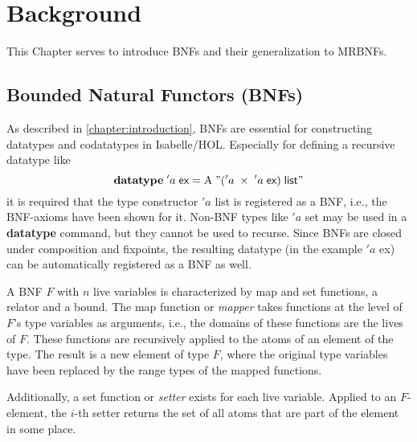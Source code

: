 
\chapter{Background}
\label{chapter:background}

  This Chapter serves to introduce \acp{BNF} and their generalization to \acp{MRBNF}. 
  \section{Bounded Natural Functors (BNFs)}
    As described in \autoref{chapter:introduction}, \acp{BNF} are essential for constructing datatypes and codatatypes in Isabelle/HOL. Especially for defining a recursive datatype like 
    \begin{equation*}
      \textbf{datatype}\; 'a\; \textsf{ex} = \text{A}\; "('a\; \times\; 'a\; \textsf{ex})\; \textsf{list}"
    \end{equation*}
    it is required that the type constructor \textsf{$'a$ list} is registered as a \ac{BNF}, i.e., the \ac{BNF}-axioms have been shown for it. Non-\ac{BNF} types like \textsf{$'a$ set} may be used in a \textbf{datatype} command, but they cannot be used to recurse. Since \acp{BNF} are closed under composition and fixpoints, the resulting datatype (in the example \textsf{$'a$ ex}) can be automatically registered as a \ac{BNF} as well.


    A \ac{BNF} $F$ with $n$ live variables is characterized by map and set functions, a relator and a bound. The map function or \textit{mapper} takes functions at the level of $F$'s type variables as arguments, i.e., the domains of these functions are the lives of $F$. These functions are recursively applied to the atoms of an element of the type. The result is a new element of type $F$, where the original type variables have been replaced by the range types of the mapped functions.

    Additionally, a set function or \textit{setter} exists for each live variable. Applied to an $F$-element, the $i$-th setter returns the set of all atoms that are part of the element in some place.


